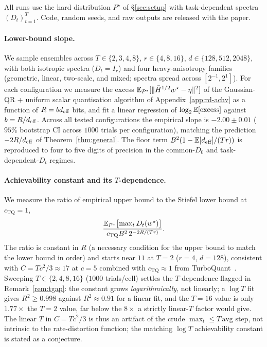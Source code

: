All runs use the hard distribution $P^\star$ of \S\ref{sec:setup} with
task-dependent spectra $(D_t)_{t=1}^T$. Code, random seeds, and raw
outputs are released with the paper.

\paragraph{Lower-bound slope.} We sample ensembles across
$T\in\{2,3,4,8\}$, $r\in\{4,8,16\}$, $d\in\{128,512,2048\}$, with both
isotropic spectra ($D_t = I_r$) and four heavy-anisotropy families
(geometric, linear, two-scale, and mixed; spectra spread across
$[2^{-1}, 2^1]$). For each configuration we measure the excess
$\mathbb{E}_{P^\star}[\|\bar H^{1/2}w^\star - \eta\|^2]$ of the Gaussian-QR +
uniform scalar quantisation algorithm of Appendix~\ref{app:rd-achv} as a function
of $R = bd_{\mathrm{eff}}$ bits, and fit a linear regression of
$\log_2\mathbb{E}[\text{excess}]$ against $b = R/d_{\mathrm{eff}}$. Across all tested
configurations the empirical slope is $-2.00 \pm 0.01$ ($95\%$
bootstrap CI across $1000$ trials per configuration), matching the
prediction $-2R/d_{\mathrm{eff}}$ of Theorem~\ref{thm:general}. The floor term
$B^2(1 - \mathbb{E}[d_{\mathrm{eff}}]/(Tr))$ is reproduced to four to five digits of
precision in the common-$D_0$ and task-dependent-$D_t$ regimes.

\paragraph{Achievability constant and its $T$-dependence.} We measure
the ratio of empirical upper bound to the Stiefel lower bound at
$c_{\mathrm{TQ}} = 1$,
\begin{equation*}
  \frac{\mathbb{E}_{P^\star}\bigl[\max_t D_t(w^\star)\bigr]}
       {c_{\mathrm{TQ}} B^2\, 2^{-2R/(Tr)}}.
\end{equation*}
The ratio is constant in $R$ (a necessary
condition for the upper bound to match the lower bound in order) and
starts near $11$ at $T = 2$ ($r = 4$, $d = 128$), consistent with
$C = Tc^2/3 \approx 17$ at $c = 5$ combined with
$c_{\mathrm{TQ}} \approx 1$ from
TurboQuant~\citep{zandieh2025turboquant}. Sweeping
$T \in \{2, 4, 8, 16\}$ ($1000$ trials/cell) settles the $T$-dependence
flagged in Remark~\ref{rem:tgap}: the constant grows
\emph{logarithmically}, not linearly; a $\log T$ fit gives
$R^2 \geq 0.998$ against $R^2 \approx 0.91$ for a linear fit, and the
$T{=}16$ value is only $1.77\times$ the $T{=}2$ value, far below the
$8\times$ a strictly linear-$T$ factor would give. The linear $T$ in
$C = Tc^2/3$ is thus an artifact of the crude
$\max_t \leq T\,\mathrm{avg}$ step, not intrinsic to the
rate-distortion function; the matching $\log T$ achievability constant
is stated as a conjecture.

